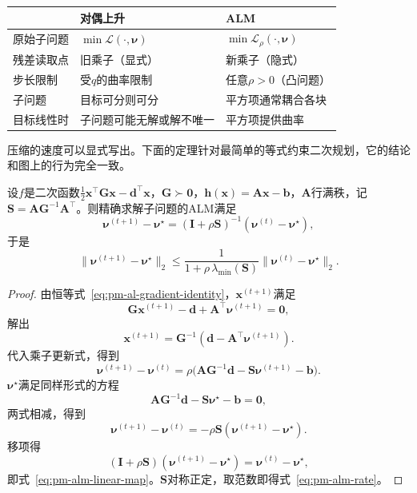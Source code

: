 \begin{BookInlineTable}
  \centering
  \begin{tabular}{@{}lll@{}}
    \toprule
     & 对偶上升 & ALM\\
    \midrule
    原始子问题 & $\min\mathcal{L}(\cdot,\bm{\nu})$ & $\min\mathcal{L}_\rho(\cdot,\bm{\nu})$\\
    残差读取点 & 旧乘子（显式） & 新乘子（隐式）\\
    步长限制 & 受$q$的曲率限制 & 任意$\rho>0$（凸问题）\\
    子问题 & 目标可分则可分 & 平方项通常耦合各块\\
    目标线性时 & 子问题可能无解或解不唯一 & 平方项提供曲率\\
    \bottomrule
  \end{tabular}
  \caption{对偶上升与ALM的对照。ALM用更难的子问题换取稳定的乘子更新。}
  \label{tab:pm-dual-vs-alm}
\end{BookInlineTable}

压缩的速度可以显式写出。下面的定理针对最简单的等式约束二次规划，它的结论和图上的行为完全一致。

\begin{theorem}[线性等式二次问题的压缩率]
\label{thm:pm-alm-quadratic-rate}
设$f$是二次函数$\tfrac12\bm{x}^\top\bm{G}\bm{x}-\bm{d}^\top\bm{x}$，$\bm{G}\succ\bm{0}$，$\bm{h}(\bm{x})=\bm{A}\bm{x}-\bm{b}$，$\bm{A}$行满秩，记$\bm{S}=\bm{A}\bm{G}^{-1}\bm{A}^\top$。则精确求解子问题的ALM满足
\begin{equation}
 \bm{\nu}^{(t+1)}-\bm{\nu}^\star=(\bm{I}+\rho\bm{S})^{-1}(\bm{\nu}^{(t)}-\bm{\nu}^\star),
 \label{eq:pm-alm-linear-map}
\end{equation}
于是
\begin{equation}
 \lVert\bm{\nu}^{(t+1)}-\bm{\nu}^\star\rVert_2\leq\frac{1}{1+\rho\,\lambda_{\min}(\bm{S})}\lVert\bm{\nu}^{(t)}-\bm{\nu}^\star\rVert_2 .
 \label{eq:pm-alm-rate}
\end{equation}
\end{theorem}

\begin{proof}
由恒等式~\eqref{eq:pm-al-gradient-identity}，$\bm{x}^{(t+1)}$满足
\[
 \bm{G}\bm{x}^{(t+1)}-\bm{d}+\bm{A}^\top\bm{\nu}^{(t+1)}=\bm{0},
\]
解出
\[
 \bm{x}^{(t+1)}=\bm{G}^{-1}(\bm{d}-\bm{A}^\top\bm{\nu}^{(t+1)}).
\]
代入乘子更新式，得到
\[
 \bm{\nu}^{(t+1)}-\bm{\nu}^{(t)}=\rho\bigl(\bm{A}\bm{G}^{-1}\bm{d}-\bm{S}\bm{\nu}^{(t+1)}-\bm{b}\bigr).
\]
$\bm{\nu}^\star$满足同样形式的方程
\[
 \bm{A}\bm{G}^{-1}\bm{d}-\bm{S}\bm{\nu}^\star-\bm{b}=\bm{0},
\]
两式相减，得到
\[
 \bm{\nu}^{(t+1)}-\bm{\nu}^{(t)}=-\rho\bm{S}(\bm{\nu}^{(t+1)}-\bm{\nu}^\star).
\]
移项得
\[
 (\bm{I}+\rho\bm{S})(\bm{\nu}^{(t+1)}-\bm{\nu}^\star)=\bm{\nu}^{(t)}-\bm{\nu}^\star ,
\]
即式~\eqref{eq:pm-alm-linear-map}。$\bm{S}$对称正定，取范数即得式~\eqref{eq:pm-alm-rate}。
\end{proof}

